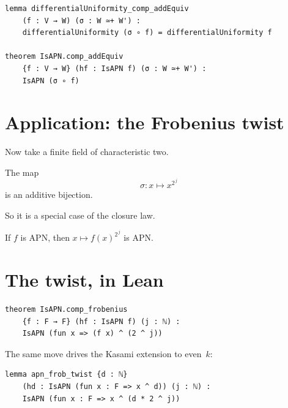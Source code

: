 \documentclass[11pt]{article}
\begin{document}
\bigskip

\begin{lstlisting}
lemma differentialUniformity_comp_addEquiv
    (f : V → W) (σ : W ≃+ W') :
    differentialUniformity (σ ∘ f) = differentialUniformity f

theorem IsAPN.comp_addEquiv
    {f : V → W} (hf : IsAPN f) (σ : W ≃+ W') :
    IsAPN (σ ∘ f)
\end{lstlisting}

\bigskip


\newpage


\section{Application: the Frobenius twist}

\bigskip

Now take a finite field of characteristic two.

\bigskip

The map
\[
  \sigma : x \mapsto x^{2^{\,j}}
\]
is an additive bijection.

\bigskip

So it is a special case of the closure law.

\bigskip

\begin{corollary}
If $f$ is APN, then $x \mapsto f(x)^{2^{\,j}}$ is APN.
\end{corollary}

\newpage


\section{The twist, in Lean}

\bigskip

\begin{lstlisting}
theorem IsAPN.comp_frobenius
    {f : F → F} (hf : IsAPN f) (j : ℕ) :
    IsAPN (fun x => (f x) ^ (2 ^ j))
\end{lstlisting}

\bigskip

The same move drives the Kasami extension to even~$k$:

\bigskip

\begin{lstlisting}
lemma apn_frob_twist {d : ℕ}
    (hd : IsAPN (fun x : F => x ^ d)) (j : ℕ) :
    IsAPN (fun x : F => x ^ (d * 2 ^ j))
\end{lstlisting}
\end{document}
